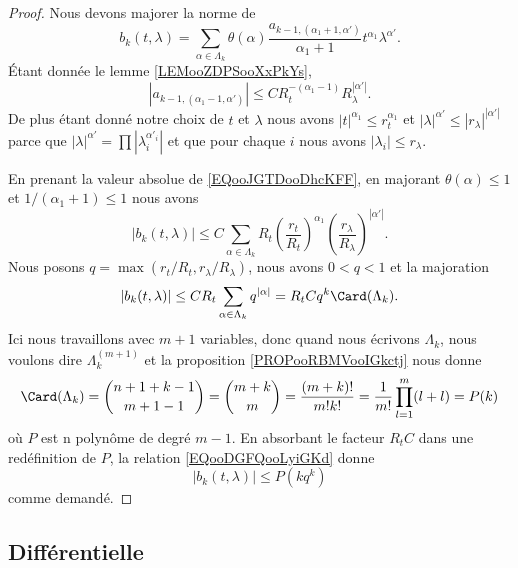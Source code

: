 \begin{proof}
	Nous devons majorer la norme de
	\begin{equation}		\label{EQooJGTDooDhcKFF}
		b_k(t,\lambda)=\sum_{\alpha\in\Lambda_k}\theta(\alpha)\frac{ a_{k-1,(\alpha_1+1,\alpha')} }{ \alpha_1+1 }t^{\alpha_1}\lambda^{\alpha'}.
	\end{equation}
	Étant donnée le lemme \ref{LEMooZDPSooXxPkYs},
	\begin{equation}
		| a_{k-1,(\alpha_1-1,\alpha')} |\leq CR_t^{-(\alpha_1-1)}R_{\lambda}^{| \alpha' |}.
	\end{equation}
	De plus étant donné notre choix de \( t\) et \( \lambda\) nous avons \( | t |^{\alpha_1}\leq r_t^{\alpha_1}\) et \( | \lambda |^{\alpha'}\leq | r_{\lambda} |^{| \alpha' |}\) parce que \( | \lambda |^{\alpha'}=\prod| \lambda_i^{\alpha'_i} |\) et que pour chaque \( i\) nous avons \( | \lambda_i |\leq r_{\lambda}\).

	En prenant la valeur absolue de \eqref{EQooJGTDooDhcKFF}, en majorant \( \theta(\alpha)\leq 1\) et \( 1/(\alpha_1+1)\leq 1\) nous avons
	\begin{equation}
		| b_k(t,\lambda) |\leq C\sum_{\alpha\in\Lambda_k}R_t\left( \frac{ r_t }{ R_t } \right)^{\alpha_1}\left( \frac{ r_{\lambda} }{ R_{\lambda} } \right)^{| \alpha' |}.
	\end{equation}
	Nous posons \( q=\max(r_t/R_t,r_{\lambda}/R_{\lambda})\), nous avons \( 0<q<1\) et la majoration
	\begin{equation}		\label{EQooDGFQooLyiGKd}
		| b_k(t,\lambda) |\leq CR_t\sum_{\alpha\in\Lambda_k}q^{| \alpha |}=R_tCq^k\Card(\Lambda_k).
	\end{equation}
	Ici nous travaillons avec \( m+1\) variables, donc quand nous écrivons \( \Lambda_k\), nous voulons dire \( \Lambda_k^{(m+1)}\) et la proposition \ref{PROPooRBMVooIGkctj} nous donne
	\begin{equation}
		\Card(\Lambda_k)=\binom{ n+1+k-1 }{ m+1-1 }=\binom{ m+k }{ m }=\frac{ (m+k)! }{ m!k! }=\frac{1}{ m!}\prod_{l=1}^m(l+l)=P(k)
	\end{equation}
	où \( P\) est n polynôme de degré \( m-1\). En absorbant le facteur \( R_tC\) dans une redéfinition de \( P\), la relation \eqref{EQooDGFQooLyiGKd} donne
	\begin{equation}
		| b_k(t,\lambda) |\leq P(kq^k)
	\end{equation}
	comme demandé.
\end{proof}


\subsection{Différentielle}


